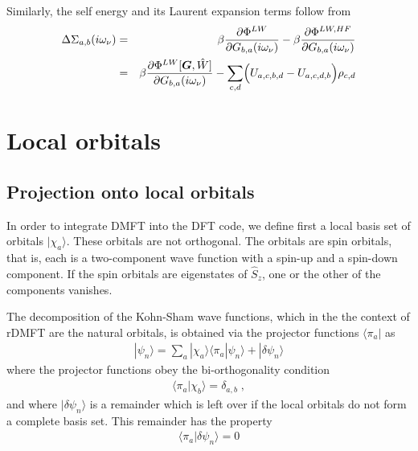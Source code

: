 \documentclass[11pt,a4paper]{report}
\begin{document}
Similarly, the self energy and its Laurent expansion terms follow from
\begin{eqnarray}
\Delta\Sigma_{a,b}(i\omega_\nu)&=&
\beta\frac{\partial\Phi^{LW}}{\partial G_{b,a}(i\omega_\nu)}
-\beta\frac{\partial\Phi^{LW,HF}}{\partial G_{b,a}(i\omega_\nu)}
\nonumber\\
&=&\beta\frac{\partial\Phi^{LW}[\bm{G},\hat{W}]}{\partial G_{b,a}(i\omega_\nu)}
-\sum_{c,d}\Bigl(U_{a,c,b,d}-U_{a,c,d,b}\Bigr)\rho_{c,d}
\end{eqnarray}
%
\newpage
\section{Local orbitals}
\subsection{Projection onto local orbitals}
In order to integrate DMFT into the DFT code, we define first a local
basis set of orbitals $|\chi_a\rangle$. These orbitals are not
orthogonal. The orbitals are spin orbitals, that is, each is a
two-component wave function with a spin-up and a spin-down
component. If the spin orbitals are eigenstates of $\hat{S}_z$, one or
the other of the components vanishes.

The decomposition of the Kohn-Sham wave functions,
which in the the context of rDMFT are the natural orbitals, is
obtained via the projector functions $\langle\pi_a|$ as
\begin{eqnarray}
|\psi_n\rangle=\sum_a|\chi_a\rangle\langle\pi_a|\psi_n\rangle
+|\delta\psi_n\rangle
\end{eqnarray}
where the projector functions obey the bi-orthogonality condition
\begin{eqnarray}
\langle\pi_a|\chi_b\rangle=\delta_{a,b}\;,
\end{eqnarray}
and where $|\delta\psi_n\rangle$ is a remainder which is left over if the
local orbitals do not form a complete basis set. This remainder has
the property
\begin{eqnarray}
\langle\pi_a|\delta\psi_n\rangle=0
\end{eqnarray}

\end{document}
